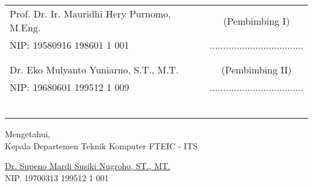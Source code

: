     \noindent
    \begin{tabularx}{\textwidth}{X c}
      Prof. Dr. Ir. Mauridhi Hery Purnomo, M.Eng.          & (Pembimbing I) \\
      NIP: 	19580916 198601 1 001       & ................................... \\
      &  \\
      &  \\
      Dr. Eko Mulyanto Yuniarno, S.T., M.T.     & (Pembimbing II) \\
      NIP: 19680601 199512 1 009        & ................................... \\
      &  \\
      &  \\
      &  \\
      &  \\
      &  \\
      &  \\
    \end{tabularx}
  \endgroup

  \vspace{1ex}

  \begin{center}
    Mengetahui, \\
    Kepala Departemen Teknik Komputer FTEIC - ITS \\

    \vspace{7ex}

    \underline{Dr. Supeno Mardi Susiki Nugroho, ST., MT.} \\
    NIP. 19700313 199512 1 001
  \end{center}
\endgroup
